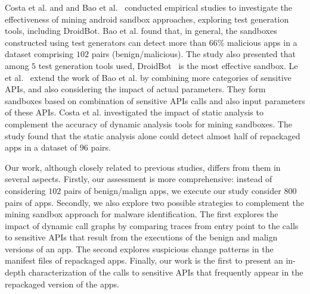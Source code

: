 


Costa et al. and and Bao et al.~\cite{DBLP:conf/wcre/BaoLL18,DBLP:conf/scam/CostaMCMVBC20} conducted empirical studies to investigate the effectiveness of mining android sandbox
approaches, exploring test generation tools, including DroidBot. Bao et al. found that, in general, the sandboxes constructed using test generators can detect more than $66$\% malicious apps in a dataset comprising $102$ pairs (benign/malicious). The study also presented that among $5$ test generation tools used, DroidBot~\cite{DBLP:conf/icse/LiYGC17} is the most effective sandbox.
Le et al.~\cite{le2018towards} extend the work of Bao et al. by combining more categories of sensitive APIs, and also considering the impact of
actual parameters. They form sandboxes based on combination of sensitive APIs calls and also input parameters of these APIs.
Costa et al.\cite{DBLP:journals/jss/CostaMMSSBNR22} investigated the impact of static analysis to complement the accuracy of dynamic analysis tools for mining sandboxes. The study found that the static analysis alone could detect almost half of repackaged apps in a dataset of $96$ pairs.


Our work, although closely related to previous studies, differs from them in several aspects.  Firstly, our assessment is more comprehensive: instead of considering $102$ pairs of benign/malign apps, we execute our study consider 800 pairs of apps. Secondly, we also explore two possible strategies to complement the mining sandbox approach for malware identification. The first explores the impact of dynamic call graphs by comparing traces from entry point to the calls to sensitive APIs that result from the executions of the benign and malign versions of an app. The second explores suspicious change patterns in the manifest files of repackaged apps. Finally, our work is the first to present an in-depth characterization of the calls to sensitive APIs that frequently appear in the repackaged version of the apps.
